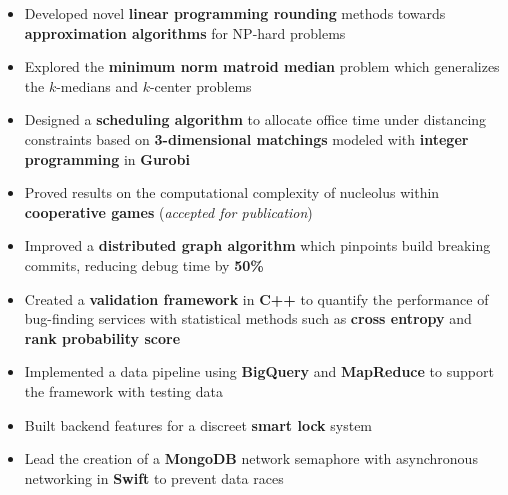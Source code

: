 \documentclass[11pt,a4paper]{altacv}
\begin{document}
\begin{paracol}{2}
\makecvheader

\begin{itemize}
    \item Developed novel \textbf{linear programming rounding} methods
      towards \textbf{approximation algorithms} for NP-hard problems
    \item Explored the \textbf{minimum norm matroid median} problem
      which generalizes the $k$-medians and $k$-center problems
\end{itemize}

\divider %

\begin{itemize}
    \item Designed a \textbf{scheduling algorithm} to allocate office time under distancing constraints
      based on \textbf{3-dimensional matchings} modeled with \textbf{integer programming} in \textbf{Gurobi}
    \item Proved results on the computational complexity of nucleolus
      within \textbf{cooperative games}
      (\emph{accepted for publication})
\end{itemize}

\divider

\begin{itemize}
    \item Improved a \textbf{distributed graph algorithm} which pinpoints build breaking commits,
      reducing debug time by \textbf{50\%}
    \item Created a \textbf{validation framework} in \textbf{C++}
      to quantify the performance of bug-finding services
      with statistical methods such as \textbf{cross entropy} and \textbf{rank probability score}
    \item Implemented a data pipeline using \textbf{BigQuery} and \textbf{MapReduce}
      to support the framework with testing data
\end{itemize}

\divider

\begin{itemize}
    \item Built backend features for a discreet \textbf{smart lock} system
    \item Lead the creation of a \textbf{MongoDB} network semaphore with asynchronous networking in \textbf{Swift}
      to prevent data races
\end{itemize}


\end{paracol}
\end{document}
